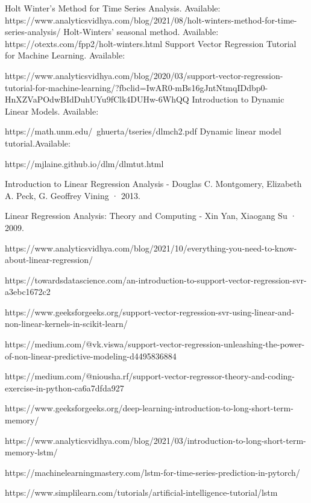\documentclass{ieeeojies}
\begin{document}
\begin{thebibliography}{00}

 Holt Winter’s Method for Time Series Analysis. Available: https://www.analyticsvidhya.com/blog/2021/08/holt-winters-method-for-time-series-analysis/
 Holt-Winters’ seasonal method. Available: https://otexts.com/fpp2/holt-winters.html
 Support Vector Regression Tutorial for Machine Learning. Available: 

https://www.analyticsvidhya.com/blog/2020/03/support-vector-regression-tutorial-for-machine-learning/?fbclid=IwAR0-mBs16gJntNtmqIDdbp0-HnXZVaPOdwBIdDuhUYu9fClk4DUHw-6WhQQ
 Introduction to Dynamic Linear Models. Available: 

https://math.unm.edu/~ghuerta/tseries/dlmch2.pdf
 Dynamic linear model tutorial.Available: 

https://mjlaine.github.io/dlm/dlmtut.html

 Introduction to Linear Regression Analysis - Douglas C. Montgomery, Elizabeth A. Peck, G. Geoffrey Vining · 2013.

 Linear Regression Analysis: Theory and Computing - Xin Yan, Xiaogang Su · 2009. 

 https://www.analyticsvidhya.com/blog/2021/10/everything-you-need-to-know-about-linear-regression/

 https://towardsdatascience.com/an-introduction-to-support-vector-regression-svr-a3ebc1672c2

 https://www.geeksforgeeks.org/support-vector-regression-svr-using-linear-and-non-linear-kernels-in-scikit-learn/

 https://medium.com/@vk.viswa/support-vector-regression-unleashing-the-power-of-non-linear-predictive-modeling-d4495836884

 https://medium.com/@niousha.rf/support-vector-regressor-theory-and-coding-exercise-in-python-ca6a7dfda927

 https://www.geeksforgeeks.org/deep-learning-introduction-to-long-short-term-memory/

 https://www.analyticsvidhya.com/blog/2021/03/introduction-to-long-short-term-memory-lstm/

 https://machinelearningmastery.com/lstm-for-time-series-prediction-in-pytorch/

 https://www.simplilearn.com/tutorials/artificial-intelligence-tutorial/lstm


\end{thebibliography}
\end{document}
